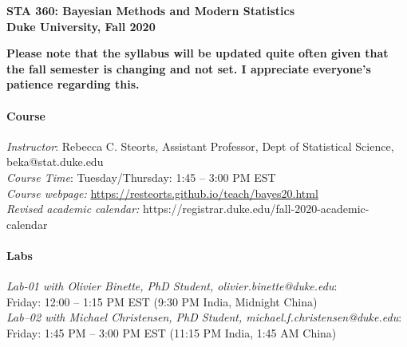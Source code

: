 \documentclass[11pt]{article}
\date{}
\begin{document}
\begin{center}
{\Large\bf STA 360: Bayesian Methods and Modern Statistics} \\

{\Large\bf Duke University, Fall 2020} \\
\end{center}

\textbf{Please note that the syllabus will be updated quite often given that the fall semester is changing and not set. I appreciate everyone's patience regarding this.} 

\paragraph{Course}
\emph{Instructor}: Rebecca C. Steorts,  Assistant Professor, Dept of Statistical Science, beka@stat.duke.edu\\
\emph{Course Time}: Tuesday/Thursday: 1:45 -- 3:00 PM EST \\
\emph{Course webpage:} \url{https://resteorts.github.io/teach/bayes20.html} \\
\emph{Revised academic calendar:} https://registrar.duke.edu/fall-2020-academic-calendar

\paragraph{Labs}
\emph{Lab-01 with Olivier Binette, PhD Student, olivier.binette@duke.edu}: \\Friday: 12:00 -- 1:15 PM EST (9:30 PM India, Midnight China)\\
\emph{Lab--02 with Michael Christensen, PhD Student, michael.f.christensen@duke.edu}: \\Friday: 1:45 PM -- 3:00 PM EST (11:15 PM India, 1:45 AM China)\\

\vspace*{1em}
\end{document}
